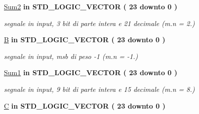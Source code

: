 \begin{DoxyCompactItemize}
\hyperlink{group___linear_regression_ga4c98819455589b84c5e250a97e9bdfa1}{Sum2}  {\bfseries {\bfseries \textcolor{vhdlchar}{in}\textcolor{vhdlchar}{ }}} {\bfseries \textcolor{vhdlchar}{S\+T\+D\+\_\+\+L\+O\+G\+I\+C\+\_\+\+V\+E\+C\+T\+OR}\textcolor{vhdlchar}{ }\textcolor{vhdlchar}{(}\textcolor{vhdlchar}{ }\textcolor{vhdlchar}{ } \textcolor{vhdldigit}{23} \textcolor{vhdlchar}{ }\textcolor{vhdlchar}{downto}\textcolor{vhdlchar}{ }\textcolor{vhdlchar}{ } \textcolor{vhdldigit}{0} \textcolor{vhdlchar}{ }\textcolor{vhdlchar}{)}\textcolor{vhdlchar}{ }} 
\begin{DoxyCompactList}\small\item\em segnale in input, 3 bit di parte intera e 21 decimale (m.\+n = 2.) \end{DoxyCompactList}\item 
\hyperlink{group___linear_regression_gab6685be06ffd9f2425d01307287a4454}{B}  {\bfseries {\bfseries \textcolor{vhdlchar}{in}\textcolor{vhdlchar}{ }}} {\bfseries \textcolor{vhdlchar}{S\+T\+D\+\_\+\+L\+O\+G\+I\+C\+\_\+\+V\+E\+C\+T\+OR}\textcolor{vhdlchar}{ }\textcolor{vhdlchar}{(}\textcolor{vhdlchar}{ }\textcolor{vhdlchar}{ } \textcolor{vhdldigit}{23} \textcolor{vhdlchar}{ }\textcolor{vhdlchar}{downto}\textcolor{vhdlchar}{ }\textcolor{vhdlchar}{ } \textcolor{vhdldigit}{0} \textcolor{vhdlchar}{ }\textcolor{vhdlchar}{)}\textcolor{vhdlchar}{ }} 
\begin{DoxyCompactList}\small\item\em segnale in input, msb di peso -\/1 (m.\+n = -\/1.) \end{DoxyCompactList}\item 
\hyperlink{group___linear_regression_ga43a9a0da4f44006af5631ed5ee8ad924}{Sum1}  {\bfseries {\bfseries \textcolor{vhdlchar}{in}\textcolor{vhdlchar}{ }}} {\bfseries \textcolor{vhdlchar}{S\+T\+D\+\_\+\+L\+O\+G\+I\+C\+\_\+\+V\+E\+C\+T\+OR}\textcolor{vhdlchar}{ }\textcolor{vhdlchar}{(}\textcolor{vhdlchar}{ }\textcolor{vhdlchar}{ } \textcolor{vhdldigit}{23} \textcolor{vhdlchar}{ }\textcolor{vhdlchar}{downto}\textcolor{vhdlchar}{ }\textcolor{vhdlchar}{ } \textcolor{vhdldigit}{0} \textcolor{vhdlchar}{ }\textcolor{vhdlchar}{)}\textcolor{vhdlchar}{ }} 
\begin{DoxyCompactList}\small\item\em segnale in input, 9 bit di parte intera e 15 decimale (m.\+n = 8.) \end{DoxyCompactList}\item 
\hyperlink{group___linear_regression_ga17058a6bcb609074c49be51d09202870}{C}  {\bfseries {\bfseries \textcolor{vhdlchar}{in}\textcolor{vhdlchar}{ }}} {\bfseries \textcolor{vhdlchar}{S\+T\+D\+\_\+\+L\+O\+G\+I\+C\+\_\+\+V\+E\+C\+T\+OR}\textcolor{vhdlchar}{ }\textcolor{vhdlchar}{(}\textcolor{vhdlchar}{ }\textcolor{vhdlchar}{ } \textcolor{vhdldigit}{23} \textcolor{vhdlchar}{ }\textcolor{vhdlchar}{downto}\textcolor{vhdlchar}{ }\textcolor{vhdlchar}{ } \textcolor{vhdldigit}{0} \textcolor{vhdlchar}{ }\textcolor{vhdlchar}{)}\textcolor{vhdlchar}{ }} 

\end{DoxyCompactItemize}
